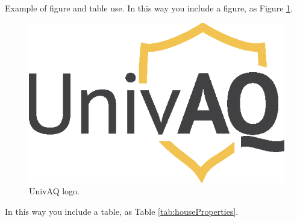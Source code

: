 \documentclass[9pt,shortpaper,twoside,web]{ieeecolor}
\begin{document}
\appendix
Example of figure and table use. In this way you include a figure, as Figure \ref{fig:fig1}.

\begin{figure}[h!]
	\centerline{\includegraphics[width=0.5\columnwidth]{figures/LOGO-generic-web.eps}}
	\caption{UnivAQ logo.}
	\label{fig:fig1}
\end{figure}

In this way you include a table, as Table \ref{tab:houseProperties}.
\end{document}
